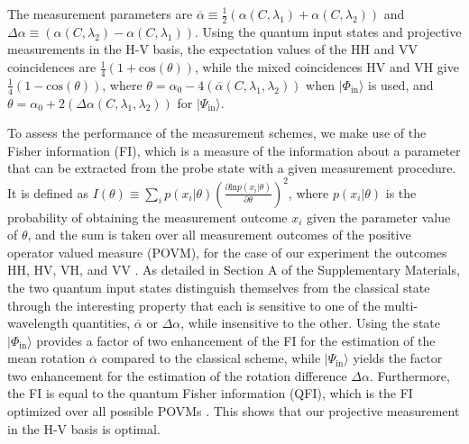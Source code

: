 \documentclass[12pt,preprint]{revtex4}
\begin{document}
The measurement parameters are $\overline{\alpha}\equiv\frac{1}{2}\left(\alpha\left(C,\lambda_{1}\right)+\alpha\left(C,\lambda_{2}\right)\right)$  and $\Delta \alpha\equiv\left(\alpha\left(C,\lambda_{2}\right)-\alpha\left(C,\lambda_{1}\right)\right)$. Using the quantum input states and projective measurements in the H-V basis, the expectation values of the HH and VV coincidences are $\frac{1}{4}\left(1+\mathrm{cos}\left(\theta\right)\right)$, while the mixed coincidences HV and VH give $\frac{1}{4}\left(1-\mathrm{cos}\left(\theta\right)\right)$, where $\theta=\alpha_{0}-4\left(\overline{\alpha}\left(C,\lambda_{1},\lambda_{2}\right)\right)$ when $|\Phi_{\mathrm{in}}\rangle$ is used, and $\theta=\alpha_{0}+2\left(\Delta\alpha\left(C,\lambda_{1},\lambda_{2}\right)\right)$ for $|\Psi_{\mathrm{in}}\rangle$.

To assess the performance of the measurement schemes, we make use of the Fisher information (FI), which is a measure of the information about a parameter that can be extracted from the probe state with a given measurement procedure. It is
defined as $ I\left(\theta \right)\equiv \sum_i p(x_i|\theta) \left( \frac{\partial \mathrm{ln} p(x_i|\theta)}{\partial \theta} \right)^2$, where $p(x_i|\theta)$ is the probability of obtaining the measurement outcome $x_i$ given the parameter value of $\theta$, and the sum is taken over all measurement outcomes of the positive operator valued measure (POVM), for the case of our experiment the outcomes HH, HV, VH, and VV \citep{Kok2010}. As detailed in Section A of the Supplementary Materials, the two quantum input states distinguish themselves from the classical state through the interesting property that each is sensitive to one of the multi-wavelength quantities, $\overline{\alpha}$ or $\Delta \alpha$, while insensitive to the other. Using the state $|\Phi_{\mathrm{in}}\rangle$ provides a factor of two enhancement of the FI for the estimation of the mean rotation $\overline{\alpha}$ compared to the classical scheme, while $|\Psi_{\mathrm{in}}\rangle$ yields the factor two enhancement for the estimation of the rotation difference $\Delta \alpha$. Furthermore, the FI is equal to the quantum Fisher information (QFI), which is the FI optimized over all possible POVMs \citep{Giovannetti2011,Toth2014}. This shows that our projective measurement in the H-V basis is optimal. 
\end{document}
